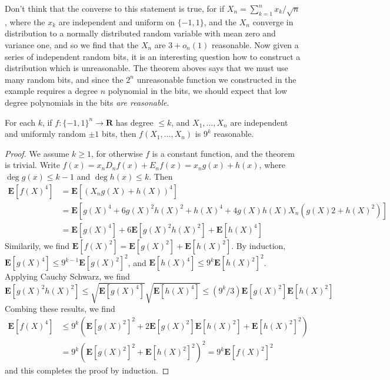 Don't think that the converse to this statement is true, for if $X_n = \sum_{k = 1}^n x_k/\sqrt{n}$, where the $x_k$ are independent and uniform on $\{ -1, 1 \}$, and the $X_n$ converge in distribution to a normally distributed random variable with mean zero and variance one, and so we find that the $X_n$ are $3 + o_n(1)$ reasonable. Now given a series of independent random bits, it is an interesting question how to construct a distribution which is unreasonable. The theorem aboves says that we must use many random bits, and since the $2^n$ unreasonable function we constructed in the example requires a degree $n$ polynomial in the bits, we should expect that low degree polynomials in the bits {\it are reasonable}.

\begin{lemma}[Bonami]
    For each $k$, if $f: \{ -1, 1 \}^n \to \mathbf{R}$ has degree $\leq k$, and $X_1, \dots, X_n$ are independent and uniformly random $\pm 1$ bits, then $f(X_1, \dots, X_n)$ is $9^k$ reasonable.
\end{lemma}
\begin{proof}
    We assume $k \geq 1$, for otherwise $f$ is a constant function, and the theorem is trivial.  Write $f(x) = x_n D_n f(x) + E_n f(x) = x_n g(x) + h(x)$, where $\deg g(x) \leq k - 1$ and $\deg h(x) \leq k$. Then
    \begin{align*}
        \mathbf{E}[f(X)^4] &= \mathbf{E}[(X_n g(X) + h(X))^4]\\
        &= \mathbf{E}[g(X)^4 + 6 g(X)^2 h(X)^2 + h(X)^4 + 4 g(X) h(X) X_n (g(X)2 + h(X)^2)]\\
        &= \mathbf{E}[g(X)^4] + 6 \mathbf{E}[g(X)^2 h(X)^2] + \mathbf{E}[h(X)^4]
    \end{align*}
    Similarily, we find $\mathbf{E}[f(X)^2] = \mathbf{E}[g(X)^2] + \mathbf{E}[h(X)^2]$. By induction, $\mathbf{E}[g(X)^4] \leq 9^{k-1} \mathbf{E}[g(X)^2]^2$, and $\mathbf{E}[h(X)^4] \leq 9^k \mathbf{E}[h(X)^2]^2$. Applying Cauchy Schwarz, we find
    \[ \mathbf{E}[g(X)^2 h(X)^2] \leq \sqrt{\mathbf{E}[g(X)^4]}\sqrt{\mathbf{E}[h(X)^4]} \leq (9^k/3) \mathbf{E}[g(X)^2] \mathbf{E}[h(X)^2] \]
    Combing these results, we find
    \begin{align*}
        \mathbf{E}[f(X)^4] &\leq 9^k \left( \mathbf{E}[g(X)^2]^2 + 2 \mathbf{E}[g(X)^2] \mathbf{E}[h(X)^2] + \mathbf{E}[h(X)^2]^2 \right)\\
        &= 9^k (\mathbf{E}[g(X)^2]^2 + \mathbf{E}[h(X)^2]^2)^2 = 9^k \mathbf{E}[f(X)^2]^2
    \end{align*}
    and this completes the proof by induction.
\end{proof}


